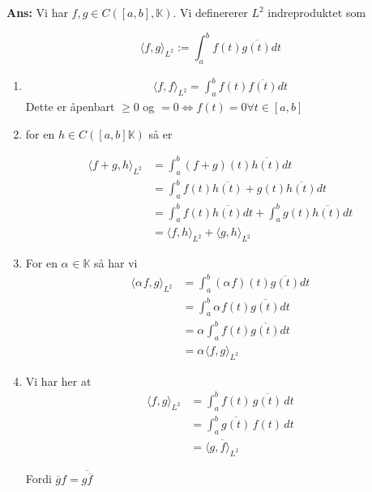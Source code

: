 \documentclass[11pt]{article}
\newenvironment{solbox}
  {\begin{mdframed}[linewidth=1pt,linecolor=black,roundcorner=5pt]
   \noindent\textbf{Ans: }\enspace}
  {\end{mdframed}}
\begin{document}
\begin{solbox}
    Vi har $ f, g \in C \left( \left[ a, b \right], \mathbb{K} \right)   $. Vi definererer $ L^2 $ indreproduktet som
    
    \[
        \langle f, g \rangle_{ L^2 } := \int_{a}^{b} f(t) \overline{g(t)} dt
    \]

    \begin{enumerate}
        \item \begin{align*}
            \langle f, f \rangle_{ L^2 } = \int_{a}^{b} f(t) \overline{f(t)} dt
        \end{align*}
        Dette er åpenbart $ \geq 0 $ og $ =0 \Longleftrightarrow f(t) = 0 \forall t \in \left[ a, b \right]  $ 
        
        \item for en $ h \in C \left(  \left[ a, b \right] \mathbb{K} \right)  $ så er 
        
        \begin{align*}
            \langle f+g, h \rangle_{ L^2 } &= \int_{a}^{b} (f+g)(t) \overline{h(t)} dt \\
            &= \int_{a}^{b} f(t) \overline{h(t)} + g(t) \overline{h(t)} dt \\
            &= \int_{a}^{b} f(t) \overline{h(t)}dt + \int_{a}^{b} g(t) \overline{h(t)}dt \\
            &= \langle f, h \rangle_{ L^2 } + \langle g, h \rangle_{ L^2 } 
        \end{align*}


        \item For en $ \alpha_{}^{} \in \mathbb{K} $ så har vi
        \begin{align*}
            \langle \alpha_{}^{} f, g \rangle_{ L^2 } &= \int_{a}^{b} \left( \alpha_{}^{} f \right)(t) \overline{g(t)}dt \\
            &=  \int_{a}^{b} \alpha_{}^{} f(t) \overline{g(t)}dt \\
            &= \alpha_{}^{} \int_{a}^{b} f(t) \overline{g(t)}dt \\
            &= \alpha_{}^{} \langle f, g \rangle_{ L^2 } 
        \end{align*}

        \item Vi har her at 
        \begin{align*}
            \langle f, g \rangle_{L^2} 
                &= \int_a^b f(t)\,\overline{g(t)}\,dt \\
                &= \int_a^b \overline{g(t)}\,f(t)\,dt \\
                &= \overline{\langle g, f \rangle_{L^2}}
        \end{align*}

        Fordi $ \overline{g} f = \overline{g \overline{f}} $ 
        


        
        
    \end{enumerate}


    
\end{solbox}
\end{document}

